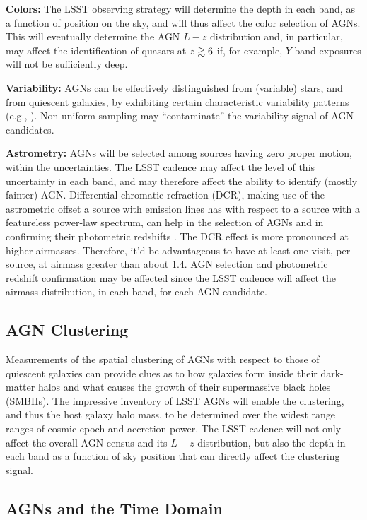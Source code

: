 {\bf Colors:} The LSST observing strategy will determine the depth in
each band, as a function of position on the sky, and will thus affect
the color selection of AGNs. This will eventually determine the AGN
$L-z$ distribution and, in particular, may affect the identification
of quasars at $z\gtrsim 6$ if, for example, $Y$-band exposures will
not be sufficiently deep.

{\bf Variability:} AGNs can be effectively distinguished from (variable)
stars, and from quiescent galaxies, by exhibiting certain characteristic
variability patterns (e.g., \citet{ButlerandBloom2011}). Non-uniform
sampling may ``contaminate'' the variability signal of AGN candidates.

{\bf Astrometry:} AGNs will be selected among sources having zero
proper motion, within the uncertainties. The LSST cadence may affect
the level of this uncertainty in each band, and may therefore affect
the ability to identify (mostly fainter) AGN.
%
Differential chromatic refraction (DCR), making use of the astrometric
offset a source with emission lines has with respect to a source with
a featureless power-law spectrum, can help in the selection of AGNs
and in confirming their photometric redshifts
\citep{KaczmarczikEtal2009}. The DCR effect is more pronounced at
higher airmasses. Therefore, it'd be advantageous to have at least one
visit, per source, at airmass greater than about 1.4. AGN selection
and photometric redshift confirmation may be affected since the LSST
cadence will affect the airmass distribution, in each band, for each
AGN candidate.

\subsection{AGN Clustering}
\label{sec:\secname:clustering}

\noindent Measurements of the spatial clustering of AGNs with respect
to those of quiescent galaxies can provide clues as to how galaxies
form inside their dark-matter halos and what causes the growth of
their supermassive black holes (SMBHs). The impressive inventory of
LSST AGNs will enable the clustering, and thus the host galaxy halo
mass, to be determined over the widest range ranges of cosmic epoch
and accretion power.
%
The LSST cadence will not only affect the overall AGN census and its
$L-z$ distribution, but also the depth in each band as a function of
sky position that can directly affect the clustering signal.

\subsection{AGNs and the Time Domain}
\label{sec:\secname:time}

